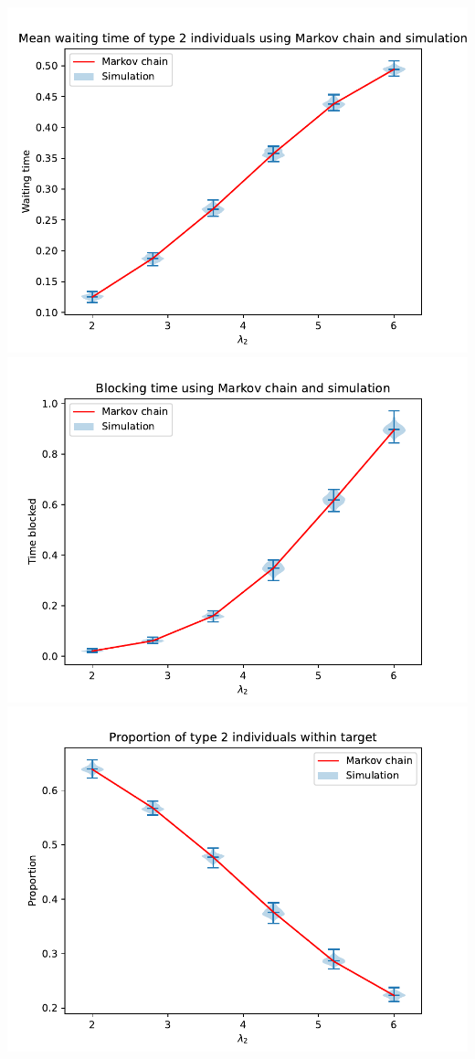 \begin{frame}
\begin{multicols}{3}
        \columnbreak
        \includegraphics[scale=0.2]{Bin/performance_measures_comparison/waiting_2_comparison.pdf}
        \includegraphics[scale=0.2]{Bin/performance_measures_comparison/blocking_comparison.pdf}
        \includegraphics[scale=0.2]{Bin/performance_measures_comparison/proportion_2_comparison.pdf}
    \end{multicols}


\end{frame}